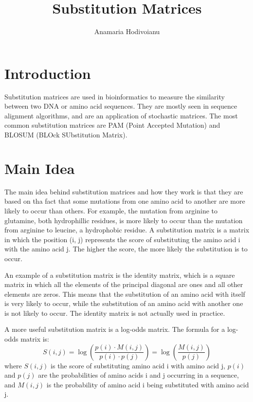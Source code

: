 \documentclass{article}
\title{Substitution Matrices}
\author{Anamaria Hodivoianu}
\begin{document}
\maketitle

\section{Introduction}
Substitution matrices are used in bioinformatics to measure the similarity between two DNA or amino acid sequences. They are mostly seen in sequence alignment algorithms, and are an application of stochastic matrices. The most common substitution matrices are PAM (Point Accepted Mutation) and BLOSUM (BLOck SUbstitution Matrix).

\section{Main Idea}
The main idea behind substitution matrices and how they work is that they are based on tha fact that some mutations from one amino acid to another are more likely to occur than others. For example, the mutation from arginine to glutamine, both hydrophillic residues, is more likely to occur than the mutation from arginine to leucine, a hydrophobic residue. A substitution matrix is a matrix in which the position (i, j) represents the score of substituting the amino acid i with the amino acid j. The higher the score, the more likely the substitution is to occur. 

An example of a substitution matrix is the identity matrix, which is a square matrix in which all the elements of the principal diagonal are ones and all other elements are zeros. This means that the substitution of an amino acid with itself is very likely to occur, while the substitution of an amino acid with another one is not likely to occur. The identity matrix is not actually used in practice.

A more useful substitution matrix is a log-odds matrix. The formula for a log-odds matrix is:
\begin{equation}
    S(i, j) = \log \left( \frac{p(i) \cdot M(i, j)}{p(i) \cdot p(j)} \right) = \log \left( \frac{M(i, j)}{p(j)} \right)
\end{equation}
where $S(i, j)$ is the score of substituting amino acid i with amino acid j, $p(i)$ and $p(j)$ are the probabilities of amino acids i and j occurring in a sequence, and $M(i, j)$ is the probability of amino acid i being substituted with amino acid j.
\end{document}
